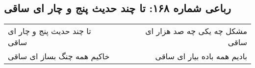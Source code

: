 \begin{center}
\section*{رباعی شماره ۱۶۸: تا چند حدیث پنج و چار ای ساقی}
\label{sec:sh168}
\begin{longtable}{l p{0.5cm} r}
تا چند حدیث پنج و چار ای ساقی
&&
مشکل چه یکی چه صد هزار ای ساقی
\\
خاکیم همه چنگ بساز ای ساقی
&&
بادیم همه باده بیار ای ساقی
\\
\end{longtable}
\end{center}
